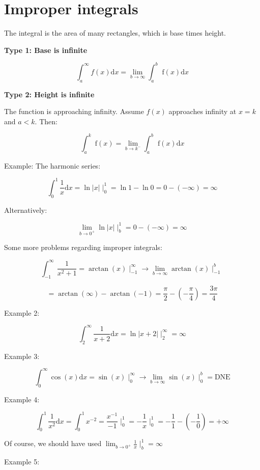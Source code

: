 \documentclass[12pt]{article}
\theoremstyle{plain}
\theoremstyle{remark}
\theoremstyle{definition}
\begin{document}
\section{Improper integrals}

The integral is the area of many rectangles, which is base times height.

\textbf{Type 1: Base is infinite}

\[\int_{a}^{\infty}{f(x)\text{d}x} = \lim_{b \rightarrow \infty}{\int_{a}^{b}{\text{\ f}(x)\text{d}x}}\]

\textbf{Type 2: Height is infinite}

The function is approaching infinity. Assume \(f(x)\) approaches
infinity at \(x = k\) and \(a < k\). Then:

\[\int_{a}^{k}{\text{\ f}(x)} = \lim_{b \rightarrow k^{-}}{\int_{a}^{b}{\text{\ f}(x)\text{d}x}}\]

Example: The harmonic series:

\[\int_{0}^{1}{\frac{1}{x}\text{d}x} = \ln|x| \mid_{0}^{1} = \ln 1 - \ln 0 = 0 - ( - \infty) = \infty\]

Alternatively:

\[\lim_{b \rightarrow 0^{+}}{\ln|x|} \mid_{b}^{1} = 0 - ( - \infty) = \infty\]

Some more problems regarding improper integrals:

\[\int_{- 1}^{\infty}\frac{1}{x^{2} + 1} = \arctan(x) \mid_{- 1}^{\infty} \rightarrow \lim_{b \rightarrow \infty}{\arctan(x) \mid_{- 1}^{b}\ }\]

\[= \arctan(\infty) - \arctan( - 1) = \frac{\pi}{2} - \left( - \frac{\pi}{4} \right) = \frac{3\pi}{4}\]

Example 2:

\[\int_{2}^{\infty}{\frac{1}{x + 2}\text{d}x} = \ln|x + 2| \mid_{2}^{\infty} = \infty\]

Example 3:

\[\int_{0}^{\infty}{\cos(x)\text{d}x} = \sin(x) \mid_{0}^{\infty} \rightarrow \lim_{b \rightarrow \infty}{\sin(x) \mid_{0}^{b}} = \text{DNE}\]

Example 4:

\[{\int_{0}^{1}{\frac{1}{x^{2}}\text{d}x} = \int_{0}^{1}x^{- 2} }{= \frac{x^{- 1}}{- 1} \mid_{0}^{1} = - \frac{1}{x} \mid_{0}^{1} }{= - \frac{1}{1} - \left( - \frac{1}{0} \right) = + \infty} \]

Of course, we should have used
\(\lim_{b \rightarrow 0^{+}}{\frac{1}{x} \mid_{b}^{1}} = \infty\)

Example 5:
\end{document}
